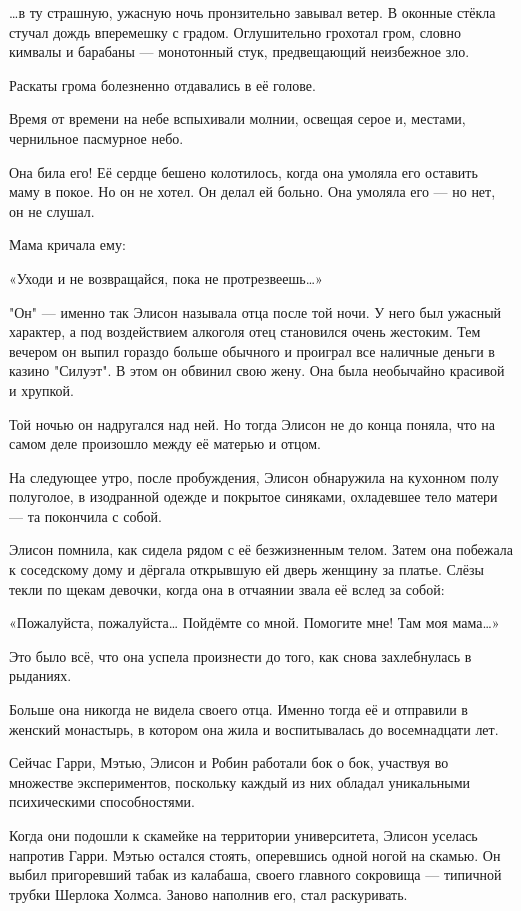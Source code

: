 \documentclass[a5paper, 9pt,
final, openany, twoside=true]{memoir}
\begin{document}
…в ту страшную, ужасную ночь пронзительно завывал ветер. В оконные стёкла стучал дождь вперемешку с градом. Оглушительно грохотал гром, словно кимвалы и барабаны — монотонный стук, предвещающий неизбежное зло.\bigskip

Раскаты грома болезненно  отдавались в её голове.\bigskip

Время от времени на небе вспыхивали молнии, освещая серое и, местами, чернильное пасмурное небо.

Она била его! Её сердце бешено колотилось, когда она умоляла его оставить маму в покое. Но он не хотел. Он делал ей больно. Она умоляла его — но нет, он не слушал.

Мама кричала ему:

«Уходи и не возвращайся, пока не протрезвеешь…»\bigskip

"Он" — именно так Элисон называла отца после той ночи. У него был ужасный характер, а под воздействием алкоголя отец становился очень жестоким. Тем вечером он выпил гораздо больше обычного и проиграл все наличные деньги в казино "Силуэт". В этом он обвинил свою жену. Она была необычайно красивой и хрупкой.

Той ночью он надругался над ней. Но тогда Элисон не до конца поняла, что на самом деле произошло между её матерью и отцом.

На следующее утро, после пробуждения, Элисон обнаружила на кухонном полу полуголое, в изодранной одежде и покрытое синяками, охладевшее тело матери — та покончила с собой.

Элисон помнила, как сидела рядом с её безжизненным телом. Затем она побежала к соседскому дому и дёргала открывшую ей дверь женщину за платье. Слёзы текли по щекам девочки, когда она в отчаянии звала её вслед за собой:

«Пожалуйста, пожалуйста… Пойдёмте со мной. Помогите мне! Там моя мама…»

Это было всё, что она успела произнести до того, как снова захлебнулась в рыданиях.

Больше она никогда не видела своего отца. Именно тогда её и отправили в женский монастырь, в котором она жила и воспитывалась до восемнадцати лет.\bigskip

Сейчас Гарри, Мэтью, Элисон и Робин работали бок о бок, участвуя во множестве экспериментов, поскольку каждый из них обладал уникальными психическими способностями.\bigskip

Когда они подошли к скамейке на территории университета, Элисон уселась напротив Гарри. Мэтью остался стоять, оперевшись одной ногой на скамью. Он выбил пригоревший табак из калабаша, своего главного сокровища — типичной трубки Шерлока Холмса. Заново наполнив его, стал раскуривать.\bigskip
\end{document}
